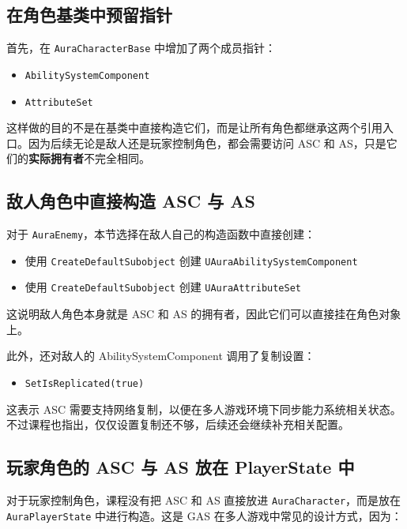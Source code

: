 \subsection{在角色基类中预留指针}

首先，在 \texttt{AuraCharacterBase} 中增加了两个成员指针：

\begin{itemize}
	\item \texttt{AbilitySystemComponent}
	\item \texttt{AttributeSet}
\end{itemize}

这样做的目的不是在基类中直接构造它们，而是让所有角色都继承这两个引用入口。因为后续无论是敌人还是玩家控制角色，都会需要访问 ASC 和 AS，只是它们的\textbf{实际拥有者}不完全相同。

\subsection{敌人角色中直接构造 ASC 与 AS}

对于 \texttt{AuraEnemy}，本节选择在敌人自己的构造函数中直接创建：

\begin{itemize}
	\item 使用 \texttt{CreateDefaultSubobject} 创建 \texttt{UAuraAbilitySystemComponent}
	\item 使用 \texttt{CreateDefaultSubobject} 创建 \texttt{UAuraAttributeSet}
\end{itemize}

这说明敌人角色本身就是 ASC 和 AS 的拥有者，因此它们可以直接挂在角色对象上。

此外，还对敌人的 AbilitySystemComponent 调用了复制设置：

\begin{itemize}
	\item \texttt{SetIsReplicated(true)}
\end{itemize}

这表示 ASC 需要支持网络复制，以便在多人游戏环境下同步能力系统相关状态。不过课程也指出，仅仅设置复制还不够，后续还会继续补充相关配置。

\subsection{玩家角色的 ASC 与 AS 放在 PlayerState 中}

对于玩家控制角色，课程没有把 ASC 和 AS 直接放进 \texttt{AuraCharacter}，而是放在 \texttt{AuraPlayerState} 中进行构造。这是 GAS 在多人游戏中常见的设计方式，因为：

